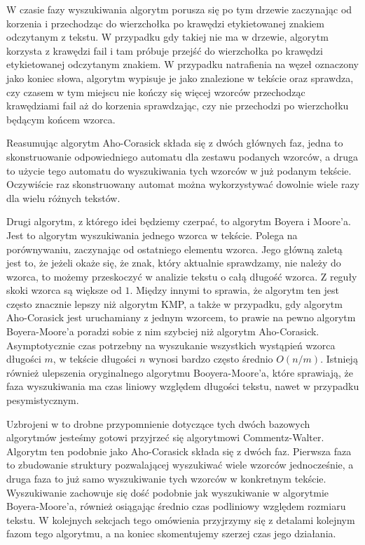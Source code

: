 \documentclass[a4paper,11pt]{article}
\begin{document}
W czasie fazy wyszukiwania algorytm porusza się po tym drzewie zaczynając od korzenia i przechodząc do wierzchołka po krawędzi etykietowanej znakiem odczytanym z tekstu. W przypadku gdy takiej nie ma w drzewie, algorytm korzysta z krawędzi fail i tam próbuje przejść do wierzchołka po krawędzi etykietowanej odczytanym znakiem. W przypadku natrafienia na węzeł oznaczony jako koniec słowa, algorytm wypisuje je jako znalezione w tekście oraz sprawdza, czy czasem w tym miejscu nie kończy się więcej wzorców przechodząc krawędziami fail aż do korzenia sprawdzając, czy nie przechodzi po wierzchołku będącym końcem wzorca. 

Reasumując algorytm Aho-Corasick składa się z dwóch głównych faz, jedna to skonstruowanie odpowiedniego automatu dla zestawu podanych wzorców, a druga to użycie tego automatu do wyszukiwania tych wzorców w już podanym tekście. Oczywiście raz skonstruowany automat można wykorzystywać dowolnie wiele razy dla wielu różnych tekstów.

Drugi algorytm, z którego idei będziemy czerpać, to algorytm Boyera i Moore'a. Jest to algorytm wyszukiwania jednego wzorca w tekście. Polega na porównywaniu, zaczynając od ostatniego elementu wzorca. Jego główną zaletą jest to, że jeżeli okaże się, że znak, który aktualnie sprawdzamy, nie należy do wzorca, to możemy przeskoczyć w analizie tekstu o całą długość wzorca. Z reguły skoki wzorca są większe od $1$. Między innymi to sprawia, że algorytm ten jest często znacznie lepszy niż algorytm KMP, a także w przypadku, gdy algorytm Aho-Corasick jest uruchamiany z jednym wzorcem, to prawie na pewno algorytm Boyera-Moore'a poradzi sobie z nim szybciej niż algorytm Aho-Corasick. Asymptotycznie czas potrzebny na wyszukanie wszystkich wystąpień wzorca długości $m$, w tekście długości $n$ wynosi bardzo często średnio $O(n/m)$. Istnieją również ulepszenia oryginalnego algorytmu Booyera-Moore'a, które sprawiają, że faza wyszukiwania ma czas liniowy względem długości tekstu, nawet w przypadku pesymistycznym.

Uzbrojeni w to drobne przypomnienie dotyczące tych dwóch bazowych algorytmów jesteśmy gotowi przyjrzeć się algorytmowi Commentz-Walter. Algorytm ten podobnie jako Aho-Corasick składa się z dwóch faz. Pierwsza faza to zbudowanie struktury pozwalającej wyszukiwać wiele wzorców jednocześnie, a druga faza to już samo wyszukiwanie tych wzorców w konkretnym tekście. Wyszukiwanie zachowuje się dość podobnie jak wyszukiwanie w algorytmie Boyera-Moore'a, również osiągając średnio czas podliniowy względem rozmiaru tekstu. W kolejnych sekcjach tego omówienia przyjrzymy się z detalami kolejnym fazom tego algorytmu, a na koniec skomentujemy szerzej czas jego działania.
\end{document}
